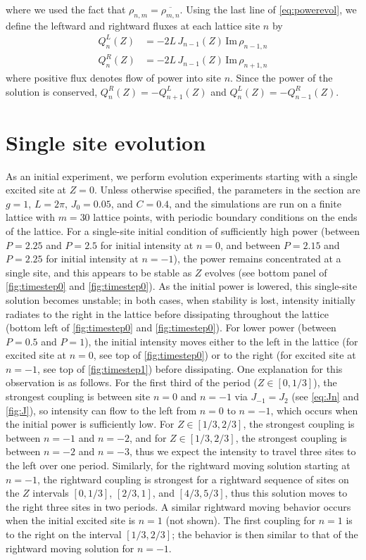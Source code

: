 \documentclass[reprint, amsmath,amssymb,aps,pre]{revtex4-2}
\begin{document}
where we used the fact that $\rho_{n,m} = \overline{\rho_{m,n}}$.
Using the last line of \cref{eq:powerevol}, we define the leftward and rightward fluxes at each lattice site $n$ by
\begin{equation}
\begin{aligned}
Q_n^L(Z) &= -2L\,J_{n-1}(Z)\,\text{Im}\,\rho_{n-1,n} \\
Q_n^R(Z) &= -2L\,J_{n-1}(Z)\,\text{Im}\,\rho_{n+1,n} 
\end{aligned}
\end{equation}
where positive flux denotes flow of power into site $n$. Since the power of the solution is conserved, $Q_n^R(Z) = -Q_{n+1}^L(Z)$ and $Q_n^L(Z) = -Q_{n-1}^R(Z)$.

\section{Single site evolution}

As an initial experiment, we perform evolution experiments starting with a single excited site at $Z=0$. Unless otherwise specified, the parameters in the section are $g=1$, $L=2\pi$, $J_0 = 0.05$, and $C=0.4$, and the simulations are run on a finite lattice with $m=30$ lattice points, with periodic boundary conditions on the ends of the lattice. For a single-site initial condition of sufficiently high power (between $P=2.25$ and $P=2.5$ for initial intensity at $n=0$, and between $P=2.15$ and $P=2.25$ for initial intensity at $n=-1$), the power remains concentrated at a single site, and this appears to be stable as $Z$ evolves (see bottom panel of \cref{fig:timestep0} and \cref{fig:timestep0}). As the initial power is lowered, this single-site solution becomes unstable; in both cases, when stability is lost, intensity initially radiates to the right in the lattice before dissipating throughout the lattice (bottom left of \cref{fig:timestep0} and \cref{fig:timestep0}). For lower power (between $P=0.5$ and $P=1$), the initial intensity moves either to the left in the lattice (for excited site at $n=0$, see top of \cref{fig:timestep0}) or to the right (for excited site at $n=-1$, see top of \cref{fig:timestep1}) before dissipating. One explanation for this observation is as follows. For the first third of the period ($Z \in [0,1/3]$), the strongest coupling is between site $n=0$ and $n=-1$ via $J_{-1} = J_2$ (see \cref{eq:Jn} and \cref{fig:J}), so intensity can flow to the left from $n=0$ to $n=-1$, which occurs when the initial power is sufficiently low. For $Z \in [1/3,2/3]$, the strongest coupling is between $n=-1$ and $n=-2$, and for $Z \in [1/3,2/3]$, the strongest coupling is between $n=-2$ and $n=-3$, thus we expect the intensity to travel three sites to the left over one period. Similarly, for the rightward moving solution starting at $n=-1$, the rightward coupling is strongest for a rightward sequence of sites on the $Z$ intervals $[0,1/3]$, $[2/3,1]$, and $[4/3,5/3]$, thus this solution moves to the right three sites in two periods. A similar rightward moving behavior occurs when the initial excited site is $n=1$ (not shown). The first coupling for $n=1$ is to the right on the interval $[1/3, 2/3]$; the behavior is then similar to that of the rightward moving solution for $n=-1$. 
\end{document}

